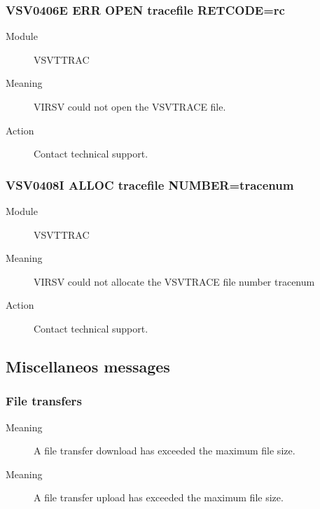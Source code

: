 \documentclass[letterpaper,10pt,english]{sphinxmanual}
\begin{document}
\subsubsection{VSV0406E ERR OPEN tracefile RETCODE=rc}
\label{\detokenize{messages:vsv0406e-err-open-tracefile-retcode-rc}}\begin{description}
\item[{Module}] \leavevmode
VSVTTRAC

\item[{Meaning}] \leavevmode
VIRSV could not open the VSVTRACE file.

\item[{Action}] \leavevmode
Contact technical support.

\end{description}


\subsubsection{VSV0408I ALLOC tracefile NUMBER=tracenum}
\label{\detokenize{messages:vsv0408i-alloc-tracefile-number-tracenum}}\begin{description}
\item[{Module}] \leavevmode
VSVTTRAC

\item[{Meaning}] \leavevmode
VIRSV could not allocate the VSVTRACE file number tracenum

\item[{Action}] \leavevmode
Contact technical support.

\end{description}


\subsection{Miscellaneos messages}
\label{\detokenize{messages:miscellaneos-messages}}

\subsubsection{File transfers}
\label{\detokenize{messages:file-transfers}}
\begin{description}
\item[{Meaning}] \leavevmode
A file transfer download has exceeded the maximum file size.

\end{description}

\begin{description}
\item[{Meaning}] \leavevmode
A file transfer upload has exceeded the maximum file size.

\end{description}



\renewcommand{\indexname}{Index}
\printindex
\end{document}
